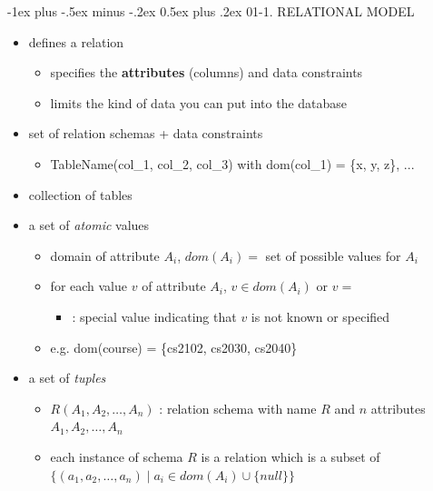 \documentclass[10pt, landscape]{article}
\makeatletter
\renewcommand{\section}{\@startsection{section}{1}{0mm}%
  {-1ex plus -.5ex minus -.2ex}%
  {0.5ex plus .2ex}%
{\normalfont\large\bfseries}}
\makeatother
\begin{document}
\begin{multicols}{3}
  \section{01-1. RELATIONAL MODEL}
  \begin{itemize}
    \item {} defines a relation
      \begin{itemize}
        \item specifies the \textbf{attributes} (columns) and data constraints
        \item {} limits the kind of data you can put into the database
      \end{itemize}
    \item {} set of relation schemas + data constraints
      \begin{itemize}
        \item TableName(col\_1, col\_2, col\_3) with dom(col\_1) = \{x, y, z\}, ...
      \end{itemize}
    \item {} collection of tables
  \end{itemize}

  \begin{itemize}
    \item {} a set of \textit{atomic} values
      \begin{itemize}
        \item domain of attribute $ A_i $, $ dom(A_i) =$ set of possible values for $ A_i $
        \item for each value $ v $ of attribute $ A_i $, $ v \in dom(A_i) $ or $ v = $ 
          \begin{itemize}
            \item {}: special value indicating that $ v $ is not known or specified
          \end{itemize}
        \item e.g. dom(course) = \{cs2102, cs2030, cs2040\}
      \end{itemize}
    \item {} a set of \textit{tuples} 
      \begin{itemize}
        \item $ R(A_1, A_2, \dots, A_n) $ : relation schema with name $ R $ and $ n $ attributes $ A_1, A_2, \dots, A_n $
        \item each instance of schema $ R $ is a relation which is a subset of $ \{(a_1, a_2, \dots, a_n) \mid a_i \in dom(A_i) \cup \{null\}\} $
      \end{itemize}
  \end{itemize}



\end{multicols}
\end{document}
